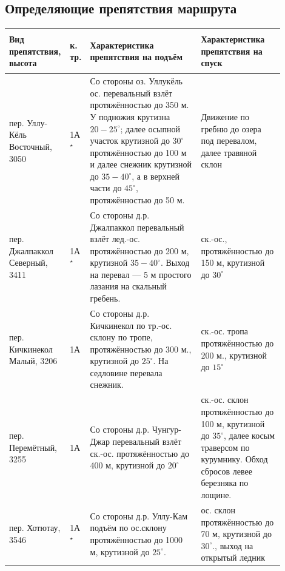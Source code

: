 \subsection{Определяющие препятствия маршрута}

\begin{table}[h!]
		\begin{tabular}{|>{\centering\arraybackslash}m{0.17\linewidth}|>{\centering\arraybackslash}m{0.03\linewidth}|>{\centering\arraybackslash}m{0.4\linewidth}|>{\centering\arraybackslash}m{0.3\linewidth}|}
			\hline
			\textbf{Вид препятствия, высота} &
			\begin{turn}{90}\textbf{к. тр.}\end{turn} &
			\textbf{Характеристика препятствия на подъём} &
			\textbf{Характеристика препятствия на спуск} \\
			\hline			
			пер. Уллу-Кёль Восточный, 3050 & 1А$^{\star}$ &  Со стороны оз. Уллукёль ос. перевальный взлёт протяжённостью до 350 м. У подножия крутизна $20-25^{\circ}$; далее осыпной участок крутизной до $30^{\circ}$ протяжённостью до 100 м и далее снежник крутизной до $35-40^{\circ}$, а в верхней части до $45^{\circ}$, протяжённостью до 50 м. & Движение по гребню до озера под перевалом, далее травяной склон \\
			\hline			
			пер. Джалпаккол Северный, 3411  & 1А$^{\star}$ & Со стороны д.р. Джалпаккол перевальный взлёт лед.-ос. протяжённостью до 200 м, крутизной $35-40^{\circ}$. Выход на перевал — 5 м простого лазания на скальный гребень.  & ск.-ос., протяжённостью до 150 м, крутизной до $30^{\circ}$ \\
			\hline
			пер. Кичкинекол Малый, 3206  & 1А & Со стороны д.р. Кичкинекол по тр.-ос. склону по тропе, протяжённостью до 300 м., крутизной до $25^{\circ}$. На седловине перевала снежник. & ск.-ос. тропа протяжённостью до 200 м., крутизной до $15^{\circ}$\\
			\hline
			пер. Перемётный, 3255  & 1А & Со стороны д.р. Чунгур-Джар перевальный взлёт ск.-ос. протяжённостью до 400 м, крутизной до  $20^{\circ}$ & ск.-ос. склон протяжённостью до 100 м, крутизной до $35^{\circ}$, далее косым траверсом по курумнику. Обход сбросов левее березняка по лощине.\\
			\hline
			пер. Хотютау, 3546  & 1А$^{\star}$ & Со стороны д.р. Уллу-Кам подъём по ос.склону протяжённостью до 1000 м, крутизной до $25^{\circ}$. &  ос. склон протяжённостью до 70 м, крутизной до $30^{\circ}$., выход на открытый ледник\\
			\hline
	\end{tabular}%
\end{table}

